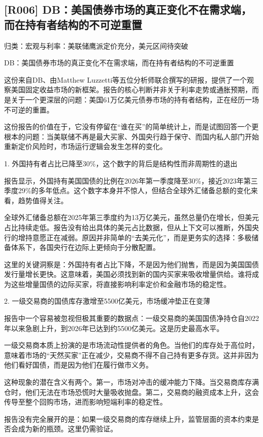 \documentclass[11pt]{ctexart}
\begin{document}
\subsection{[R006] DB：美国债券市场的真正变化不在需求端，而在持有者结构的不可逆重置}
{\small\color{refgray}归类：宏观与利率：美联储鹰派定价充分，美元区间待突破}

DB：美国债券市场的真正变化不在需求端，而在持有者结构的不可逆重置

这份来自DB、由Matthew Luzzetti等五位分析师联合撰写的研报，提供了一个观察美国固定收益市场的新框架。报告的核心判断并非关于利率走势或通胀预期，而是关于一个更深层的问题：美国61万亿美元债券市场的持有者结构，正在经历一场不可逆的重置。

这份报告的价值在于，它没有停留在“谁在买”的简单统计上，而是试图回答一个更根本的问题：当美联储不再是最大买家、外国央行趋于保守、而国内私人部门开始重新定价风险时，市场运行逻辑会发生怎样的变化。

1. 外国持有者占比已降至30\%，这个数字的背后是结构性而非周期性的退出

报告显示，外国持有美国国债的比例在2026年第一季度降至30\%，接近2023年第三季度29\%的多年低点。这个数字本身并不惊人，但结合全球外汇储备总额的变化来看，趋势值得关注。

全球外汇储备总额在2025年第三季度约为13万亿美元，虽然总量仍在增长，但美元占比持续走低。报告没有给出具体的美元占比数据，但从上下文可以推断，外国央行的增持意愿正在减弱。原因并非简单的“去美元化”，而是更务实的选择：多极储备体系下，各国央行在边际上更倾向于分散配置。

这里的关键洞察是：外国持有者占比下降，不是因为他们抛售，而是因为美国国债发行量增长更快。这意味着，美国必须找到新的国内买家来吸收增量供给。谁将成为这些增量国债的边际买家，将直接影响利率定价和金融市场的稳定性。

2. 一级交易商的国债库存激增至5500亿美元，市场缓冲垫正在变薄

报告中一个容易被忽视但极其重要的数据点：一级交易商的美国国债净持仓自2022年以来急剧上升，到2026年已达到约5500亿美元。这是历史最高水平。

一级交易商本质上扮演的是市场流动性提供者的角色。当他们的库存处于高位时，意味着市场的“天然买家”正在减少，交易商不得不自己持有更多存货。这并非因为他们看好国债，而是因为他们在履行做市义务。

这种现象的潜在含义有两个。第一，市场对冲击的缓冲能力下降。当交易商库存满仓时，他们无法在市场恐慌时大量吸收抛盘。第二，交易商的融资成本上升，这会传导至整个回购市场，进而影响短端利率的稳定性。

报告没有完全展开的是：如果一级交易商的库存继续上升，监管层面的资本约束是否会成为新的瓶颈。这里仍需验证。
\end{document}

